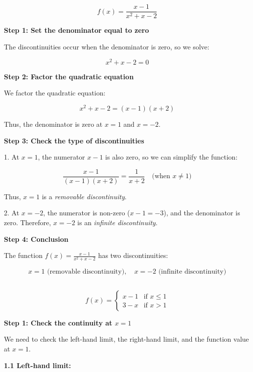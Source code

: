\documentclass{article}
\begin{document}
	
	\subsection{}	
	\[
	f(x) = \frac{x - 1}{x^2 + x - 2}
	\]
	
	\textbf{Step 1: Set the denominator equal to zero}
	
	The discontinuities occur when the denominator is zero, so we solve:
	
	\[
	x^2 + x - 2 = 0
	\]
	
	\textbf{Step 2: Factor the quadratic equation}
	
	We factor the quadratic equation:
	
	\[
	x^2 + x - 2 = (x - 1)(x + 2)
	\]
	
	Thus, the denominator is zero at \(x = 1\) and \(x = -2\).
	
	\textbf{Step 3: Check the type of discontinuities}
	
	1. At \(x = 1\), the numerator \(x - 1\) is also zero, so we can simplify the function:
	
	\[
	\frac{x - 1}{(x - 1)(x + 2)} = \frac{1}{x + 2} \quad \text{(when \(x \neq 1\))}
	\]
	
	Thus, \(x = 1\) is a \textit{removable discontinuity}.
	
	2. At \(x = -2\), the numerator is non-zero (\(x - 1 = -3\)), and the denominator is zero. Therefore, \(x = -2\) is an \textit{infinite discontinuity}.
	
	\textbf{Step 4: Conclusion}
	
	The function \( f(x) = \frac{x - 1}{x^2 + x - 2} \) has two discontinuities:
	
	\[
	\boxed{x = 1 \text{ (removable discontinuity)}, \quad x = -2 \text{ (infinite discontinuity)}}
	\]
	
	\subsection{}	
	
	\[
	f(x) = 
	\begin{cases} 
		x - 1 & \text{if } x \leq 1 \\
		3 - x & \text{if } x > 1
	\end{cases}
	\]
	
	\textbf{Step 1: Check the continuity at \(x = 1\)}
	
	We need to check the left-hand limit, the right-hand limit, and the function value at \(x = 1\).
	
	\textbf{1.1 Left-hand limit:}
	
\end{document}

